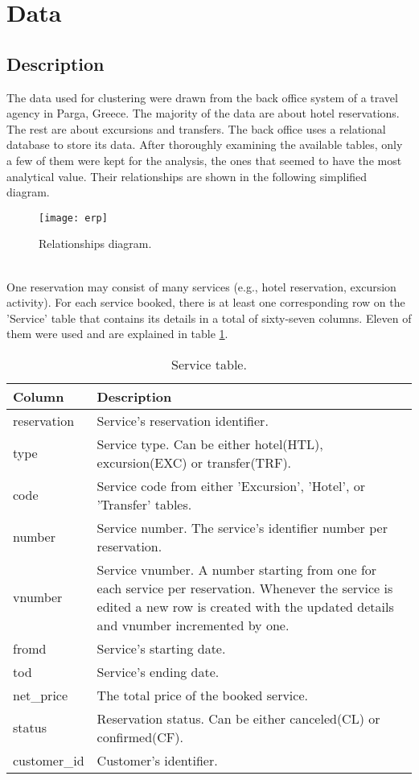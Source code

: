 \section{Data}

\subsection{Description}
The data used for clustering were drawn from the back office system of a travel agency in Parga, Greece. The majority of the data are about hotel reservations. The rest are about excursions and transfers. The back office uses a relational database to store its data. After thoroughly examining the available tables, only a few of them were kept for the analysis, the ones that seemed to have the most analytical value. Their relationships are shown in the following simplified diagram. \\
\begin{figure}[ht]
\texttt{[image: erp]}
\caption{Relationships diagram.}
\label{fig:erp}
\end{figure}
\\
One reservation may consist of many services (e.g., hotel reservation, excursion activity). For each service booked, there is at least one corresponding row on the 'Service' table that contains its details in a total of sixty-seven columns. Eleven of them were used and are explained in table \ref{tab:service}. \\
\begin{table}[h!]
\begin{center}
\begin{tabular}{l | p{12cm}}
\textcolor{theme}{\textbf{Column}} & \textcolor{theme}{\textbf{Description}}\\
\hline
reservation & Service's reservation identifier.\\
\hline
type & Service type. Can be either hotel(HTL), excursion(EXC) or transfer(TRF).\\
\hline
code & Service code from either 'Excursion', 'Hotel', or 'Transfer' tables.\\
\hline
number & Service number. The service's identifier number per reservation.\\
\hline
vnumber & Service vnumber. A number starting from one for each service per reservation. Whenever the service is edited a new row is created with the updated details and vnumber incremented by one.\\
\hline
fromd & Service's starting date.\\
\hline
tod & Service's ending date.\\
\hline
net\_price & The total price of the booked service.\\
\hline
status & Reservation status. Can be either canceled(CL) or confirmed(CF). \\
\hline
customer\_id & Customer's identifier.\\
\hline
\end{tabular}
\caption{Service table.}
\label{tab:service}
\end{center}
\end{table}
